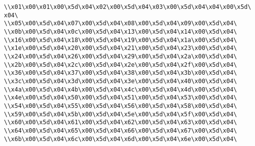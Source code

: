 \verb|\\x01\x00\x01\x00\x5d\x04\x02\x00\x5d\x04\x03\x00\x5d\x04\x04\x00\x5d\x04\|\newline
\verb|\\x05\x00\x5d\x04\x07\x00\x5d\x04\x08\x00\x5d\x04\x09\x00\x5d\x04\|\newline
\verb|\\x0b\x00\x5d\x04\x0c\x00\x5d\x04\x13\x00\x5d\x04\x14\x00\x5d\x04\|\newline
\verb|\\x16\x00\x5d\x04\x18\x00\x5d\x04\x19\x00\x5d\x04\x1a\x00\x5d\x04\|\newline
\verb|\\x1e\x00\x5d\x04\x20\x00\x5d\x04\x21\x00\x5d\x04\x23\x00\x5d\x04\|\newline
\verb|\\x24\x00\x5d\x04\x26\x00\x5d\x04\x29\x00\x5d\x04\x2a\x00\x5d\x04\|\newline
\verb|\\x2b\x00\x5d\x04\x2c\x00\x5d\x04\x2e\x00\x5d\x04\x2f\x00\x5d\x04\|\newline
\verb|\\x36\x00\x5d\x04\x37\x00\x5d\x04\x38\x00\x5d\x04\x3b\x00\x5d\x04\|\newline
\verb|\\x3c\x00\x5d\x04\x3d\x00\x5d\x04\x3e\x00\x5d\x04\x40\x00\x5d\x04\|\newline
\verb|\\x4a\x00\x5d\x04\x4b\x00\x5d\x04\x4c\x00\x5d\x04\x4d\x00\x5d\x04\|\newline
\verb|\\x4e\x00\x5d\x04\x50\x00\x5d\x04\x51\x00\x5d\x04\x53\x00\x5d\x04\|\newline
\verb|\\x54\x00\x5d\x04\x55\x00\x5d\x04\x56\x00\x5d\x04\x58\x00\x5d\x04\|\newline
\verb|\\x59\x00\x5d\x04\x5b\x00\x5d\x04\x5e\x00\x5d\x04\x5f\x00\x5d\x04\|\newline
\verb|\\x60\x00\x5d\x04\x61\x00\x5d\x04\x62\x00\x5d\x04\x63\x00\x5d\x04\|\newline
\verb|\\x64\x00\x5d\x04\x65\x00\x5d\x04\x66\x00\x5d\x04\x67\x00\x5d\x04\|\newline
\verb|\\x6b\x00\x5d\x04\x6c\x00\x5d\x04\x6d\x00\x5d\x04\x6e\x00\x5d\x04\|\newline
